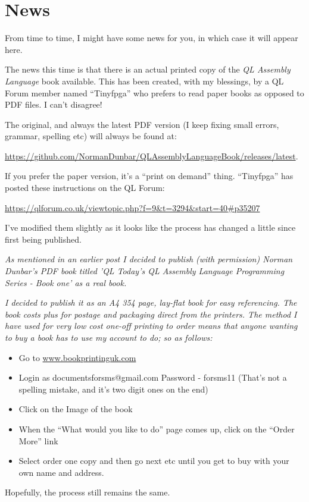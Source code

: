 \chapter{News}

From time to time, I might have some news for you, in which case it
will appear here.

The news this time is that there is an actual printed copy of the
\emph{QL Assembly Language} book available. This has been created,
with my blessings, by a QL Forum member named ``Tinyfpga'' who prefers
to read paper books as opposed to PDF files. I can't disagree!

The original, and always the latest PDF version (I keep fixing small
errors, grammar, spelling etc) will always be found at:

\href{https://github.com/NormanDunbar/QLAssemblyLanguageBook/releases/latest}{https://github.com/NormanDunbar/QLAssemblyLanguageBook/releases/latest}.

If you prefer the paper version, it's a ``print on demand'' thing.
``Tinyfpga'' has posted these instructions on the QL Forum:

\href{https://qlforum.co.uk/viewtopic.php?f=9&t=3294&start=40\#p35207}{https://qlforum.co.uk/viewtopic.php?f=9\&{}t=3294\&{}start=40\#{}p35207}

I've modified them slightly as it looks like the process has changed
a little since first being published.

\emph{As mentioned in an earlier post I decided to \textquotedbl{}publish\textquotedbl{}
(with permission) Norman Dunbar's PDF book titled 'QL Today's QL Assembly
Language Programming Series - Book one' as a real book.}

\emph{I decided to publish it as an A4 354 page, lay-flat book for
easy referencing. The book costs  plus 
for postage and packaging direct from the printers. The method I have
used for very low cost one-off printing to order means that anyone
wanting to buy a book has to use my account to do; so as follows:}
\begin{itemize}
\item Go to \href{http://www.bookprintinguk.com}{www.bookprintinguk.com} 
\item Login as documentsforsms@gmail.com Password - forsms11 (That's not
a spelling mistake, and it's two digit ones on the end)
\item Click on the Image of the book
\item When the ``What would you like to do'' page comes up, click on the
``Order More'' link
\item Select \textquotedbl{}order one copy\textquotedbl{} and then go next
etc until you get to buy with your own name and address.
\end{itemize}
Hopefully, the process still remains the same.
